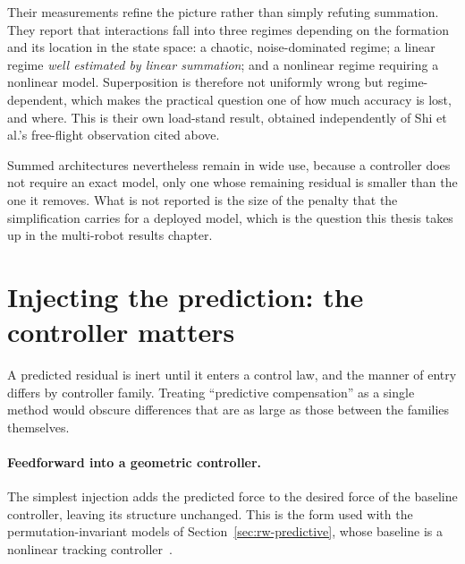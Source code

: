 Their measurements refine the picture rather than simply refuting summation. They report that
interactions fall into three regimes depending on the formation and its location in the state
space: a chaotic, noise-dominated regime; a linear regime \emph{well estimated by linear
summation}; and a nonlinear regime requiring a nonlinear model. Superposition is therefore not
uniformly wrong but regime-dependent, which makes the practical question one of how much accuracy
is lost, and where. This is their own load-stand result, obtained independently of Shi et al.'s
free-flight observation cited above.

Summed architectures nevertheless remain in wide use, because a controller does not require an
exact model, only one whose remaining residual is smaller than the one it removes. What is not
reported is the size of the penalty that the simplification carries for a deployed model, which is
the question this thesis takes up in the multi-robot results chapter.

\section{Injecting the prediction: the controller matters}
\label{sec:rw-inject}

A predicted residual is inert until it enters a control law, and the manner of entry differs by
controller family. Treating ``predictive compensation'' as a single method would obscure
differences that are as large as those between the families themselves.

\paragraph{Feedforward into a geometric controller.}
The simplest injection adds the predicted force to the desired force of the baseline controller,
leaving its structure unchanged. This is the form used with the permutation-invariant models of
Section~\ref{sec:rw-predictive}, whose baseline is a nonlinear tracking
controller~\cite{shi2020neuralswarm,shi2022neuralswarm2}.

